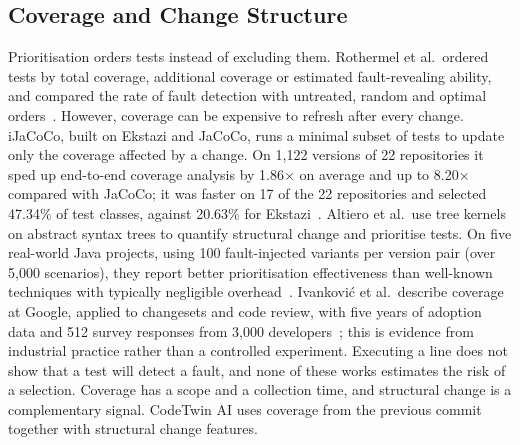 \documentclass[conference]{IEEEtran}
\begin{document}
\subsection{Coverage and Change Structure}
Prioritisation orders tests instead of excluding them. Rothermel et al.\ ordered tests by total coverage, additional coverage or estimated fault-revealing ability, and compared the rate of fault detection with untreated, random and optimal orders~\cite{rothermel2001prioritizing}. However, coverage can be expensive to refresh after every change. iJaCoCo, built on Ekstazi and JaCoCo, runs a minimal subset of tests to update only the coverage affected by a change. On 1,122 versions of 22 repositories it sped up end-to-end coverage analysis by 1.86$\times$ on average and up to 8.20$\times$ compared with JaCoCo; it was faster on 17 of the 22 repositories and selected 47.34\% of test classes, against 20.63\% for Ekstazi~\cite{wang2024ijacoco}. Altiero et al.\ use tree kernels on abstract syntax trees to quantify structural change and prioritise tests. On five real-world Java projects, using 100 fault-injected variants per version pair (over 5,000 scenarios), they report better prioritisation effectiveness than well-known techniques with typically negligible overhead~\cite{altiero2024treekernel}. Ivankovi\'c et al.\ describe coverage at Google, applied to changesets and code review, with five years of adoption data and 512 survey responses from 3,000 developers~\cite{ivankovic2019coverage}; this is evidence from industrial practice rather than a controlled experiment. Executing a line does not show that a test will detect a fault, and none of these works estimates the risk of a selection. Coverage has a scope and a collection time, and structural change is a complementary signal. CodeTwin AI uses coverage from the previous commit together with structural change features.
\end{document}
